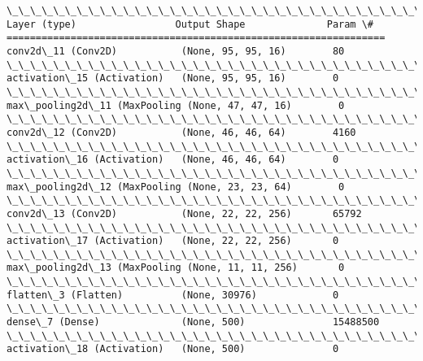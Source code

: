 \documentclass[11pt]{article}
\begin{document}
    \begin{Verbatim}[commandchars=\\\{\}]
\_\_\_\_\_\_\_\_\_\_\_\_\_\_\_\_\_\_\_\_\_\_\_\_\_\_\_\_\_\_\_\_\_\_\_\_\_\_\_\_\_\_\_\_\_\_\_\_\_\_\_\_\_\_\_\_\_\_\_\_\_\_\_\_\_
Layer (type)                 Output Shape              Param \#   
=================================================================
conv2d\_11 (Conv2D)           (None, 95, 95, 16)        80        
\_\_\_\_\_\_\_\_\_\_\_\_\_\_\_\_\_\_\_\_\_\_\_\_\_\_\_\_\_\_\_\_\_\_\_\_\_\_\_\_\_\_\_\_\_\_\_\_\_\_\_\_\_\_\_\_\_\_\_\_\_\_\_\_\_
activation\_15 (Activation)   (None, 95, 95, 16)        0         
\_\_\_\_\_\_\_\_\_\_\_\_\_\_\_\_\_\_\_\_\_\_\_\_\_\_\_\_\_\_\_\_\_\_\_\_\_\_\_\_\_\_\_\_\_\_\_\_\_\_\_\_\_\_\_\_\_\_\_\_\_\_\_\_\_
max\_pooling2d\_11 (MaxPooling (None, 47, 47, 16)        0         
\_\_\_\_\_\_\_\_\_\_\_\_\_\_\_\_\_\_\_\_\_\_\_\_\_\_\_\_\_\_\_\_\_\_\_\_\_\_\_\_\_\_\_\_\_\_\_\_\_\_\_\_\_\_\_\_\_\_\_\_\_\_\_\_\_
conv2d\_12 (Conv2D)           (None, 46, 46, 64)        4160      
\_\_\_\_\_\_\_\_\_\_\_\_\_\_\_\_\_\_\_\_\_\_\_\_\_\_\_\_\_\_\_\_\_\_\_\_\_\_\_\_\_\_\_\_\_\_\_\_\_\_\_\_\_\_\_\_\_\_\_\_\_\_\_\_\_
activation\_16 (Activation)   (None, 46, 46, 64)        0         
\_\_\_\_\_\_\_\_\_\_\_\_\_\_\_\_\_\_\_\_\_\_\_\_\_\_\_\_\_\_\_\_\_\_\_\_\_\_\_\_\_\_\_\_\_\_\_\_\_\_\_\_\_\_\_\_\_\_\_\_\_\_\_\_\_
max\_pooling2d\_12 (MaxPooling (None, 23, 23, 64)        0         
\_\_\_\_\_\_\_\_\_\_\_\_\_\_\_\_\_\_\_\_\_\_\_\_\_\_\_\_\_\_\_\_\_\_\_\_\_\_\_\_\_\_\_\_\_\_\_\_\_\_\_\_\_\_\_\_\_\_\_\_\_\_\_\_\_
conv2d\_13 (Conv2D)           (None, 22, 22, 256)       65792     
\_\_\_\_\_\_\_\_\_\_\_\_\_\_\_\_\_\_\_\_\_\_\_\_\_\_\_\_\_\_\_\_\_\_\_\_\_\_\_\_\_\_\_\_\_\_\_\_\_\_\_\_\_\_\_\_\_\_\_\_\_\_\_\_\_
activation\_17 (Activation)   (None, 22, 22, 256)       0         
\_\_\_\_\_\_\_\_\_\_\_\_\_\_\_\_\_\_\_\_\_\_\_\_\_\_\_\_\_\_\_\_\_\_\_\_\_\_\_\_\_\_\_\_\_\_\_\_\_\_\_\_\_\_\_\_\_\_\_\_\_\_\_\_\_
max\_pooling2d\_13 (MaxPooling (None, 11, 11, 256)       0         
\_\_\_\_\_\_\_\_\_\_\_\_\_\_\_\_\_\_\_\_\_\_\_\_\_\_\_\_\_\_\_\_\_\_\_\_\_\_\_\_\_\_\_\_\_\_\_\_\_\_\_\_\_\_\_\_\_\_\_\_\_\_\_\_\_
flatten\_3 (Flatten)          (None, 30976)             0         
\_\_\_\_\_\_\_\_\_\_\_\_\_\_\_\_\_\_\_\_\_\_\_\_\_\_\_\_\_\_\_\_\_\_\_\_\_\_\_\_\_\_\_\_\_\_\_\_\_\_\_\_\_\_\_\_\_\_\_\_\_\_\_\_\_
dense\_7 (Dense)              (None, 500)               15488500  
\_\_\_\_\_\_\_\_\_\_\_\_\_\_\_\_\_\_\_\_\_\_\_\_\_\_\_\_\_\_\_\_\_\_\_\_\_\_\_\_\_\_\_\_\_\_\_\_\_\_\_\_\_\_\_\_\_\_\_\_\_\_\_\_\_
activation\_18 (Activation)   (None, 500)               0         

\end{Verbatim}
\end{document}
